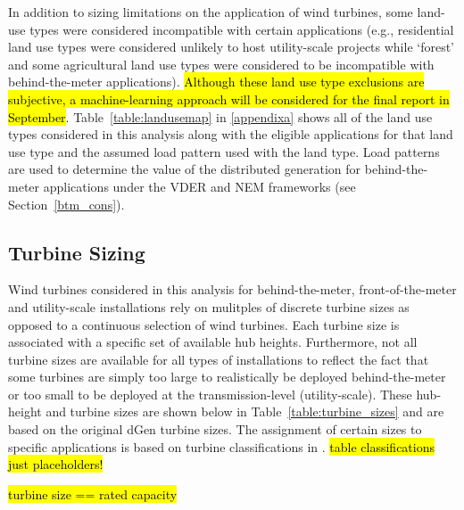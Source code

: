 In addition to sizing limitations on the application of wind turbines, some land-use types were considered incompatible with certain applications (e.g., residential land use types were considered unlikely to host utility-scale projects while `forest' and some agricultural land use types were considered to be incompatible with behind-the-meter applications). \hl{Although these land use type exclusions are subjective, a machine-learning approach will be considered for the final report in September}. Table~\ref{table:landusemap} in \ref{appendixa} shows all of the land use types considered in this analysis along with the eligible applications for that land use type and the assumed load pattern used with the land type. Load patterns are used to determine the value of the distributed generation for behind-the-meter applications under the VDER and NEM frameworks (see Section~\ref{btm_cons}).



\subsection{Turbine Sizing}
\label{meth_sizing}

Wind turbines considered in this analysis for behind-the-meter, front-of-the-meter and utility-scale installations rely on mulitples of discrete turbine sizes as opposed to a continuous selection of wind turbines. Each turbine size is associated with a specific set of available hub heights. Furthermore, not all turbine sizes are available for all types of installations to reflect the fact that some turbines are simply too large to realistically be deployed behind-the-meter or too small to be deployed at the transmission-level (utility-scale). These hub-height and turbine sizes are shown below in Table~\ref{table:turbine_sizes} and are based on the original dGen turbine sizes. The assignment of certain sizes to specific applications is based on turbine classifications in \cite{sigrin_distributed_2016}. \hl{table classifications just placeholders!}

\hl{turbine size == rated capacity}

